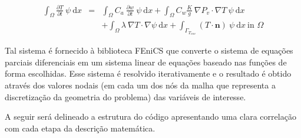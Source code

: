    \begin{eqnarray}
     \label{eq:weak_EB}
      \int_{\Omega} \frac{\partial T}{\partial t} \ \psi \ \text{d}x &=&
                                                                         \int_{\Omega}
                                                                         C_a \
                                                                         \frac{\partial
                                                                         w}{\partial
                                                                         t} \
                                                                         \psi \
                                                                         \text{d}x
                                                                         +
                                                                         \int_{\Omega}
                                                                         C_w
                                                                         \frac{K}{g}
                                                                         \
                                                                         \nabla
                                                                         P_v
                                                                         \cdot
                                                                         \nabla
                                                                         T \
                                                                         \psi \
                                                                         \text{d}x
     \nonumber \\
                                                                         & &+ \int_{\Omega} \lambda \ \nabla T \cdot \nabla \psi \ \text{d}x + \int_{\Gamma_{T_{env}}} \left( T \cdot \mathbf{n} \right) \ \psi \ \text{d}x \ \text{in } \Omega
    \end{eqnarray}

    
    Tal sistema é fornecido à biblioteca FEniCS que converte o sistema de
    equações parciais diferenciais em um sistema linear de equações baseado nas
    funções de forma escolhidas. Esse sistema é resolvido iterativamente e o
    resultado é obtido através dos valores nodais (em cada um dos nós da malha
    que representa a discretização da geometria do problema) das variáveis de interesse.

    A seguir será delineado a estrutura do código apresentando uma clara
     correlação com cada etapa da descrição matemática.
     
